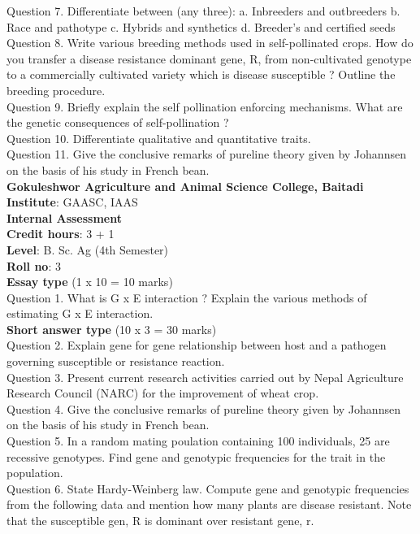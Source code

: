 \documentclass[12pt]{article}\usepackage[]{graphicx}\usepackage[]{color}
\begin{document}
Question 7. Differentiate between (any three): a. Inbreeders and outbreeders b. Race and pathotype c. Hybrids and synthetics d. Breeder's and certified seeds\\
Question 8. Write various breeding methods used in self-pollinated crops. How do you transfer a disease resistance dominant gene, R, from non-cultivated genotype to a commercially cultivated variety which is disease susceptible ? Outline the breeding procedure.\\
Question 9. Briefly explain the self pollination enforcing mechanisms. What are the genetic consequences of self-pollination ?\\
Question 10. Differentiate qualitative and quantitative traits.\\
Question 11. Give the conclusive remarks of pureline theory given by Johannsen on the basis of his study in French bean.\\
\clearpage 
{\centering \Large{\textbf{Gokuleshwor Agriculture and Animal Science College, Baitadi}} \\[0.25cm]
            \textbf{Institute}: GAASC, IAAS \\[0.2cm]
            \textbf{Internal Assessment} \\[0.2cm]} 
\textbf{Credit hours}: 3 + 1 \\ 
\textbf{Level}: B. Sc. Ag (4th Semester) \\
\textbf{Roll no}: 3 \\[0.5cm] 
\textbf{Essay type} (1 x 10 = 10 marks) \\
Question 1. What is G x E interaction ? Explain the various methods of estimating G x E interaction.\\
\textbf{Short answer type} (10 x 3 = 30 marks) \\
Question 2. Explain gene for gene relationship between host and a pathogen governing susceptible or resistance reaction.\\
Question 3. Present current research activities carried out by Nepal Agriculture Research Council (NARC) for the improvement of wheat crop.\\
Question 4. Give the conclusive remarks of pureline theory given by Johannsen on the basis of his study in French bean.\\
Question 5. In a random mating poulation containing 100 individuals, 25 are recessive genotypes. Find gene and genotypic frequencies for the trait in the population.\\
Question 6. State Hardy-Weinberg law. Compute gene and genotypic frequencies from the following data and mention how many plants are disease resistant. Note that the susceptible gen, R is dominant over resistant gene, r.\\ 
\end{document}
